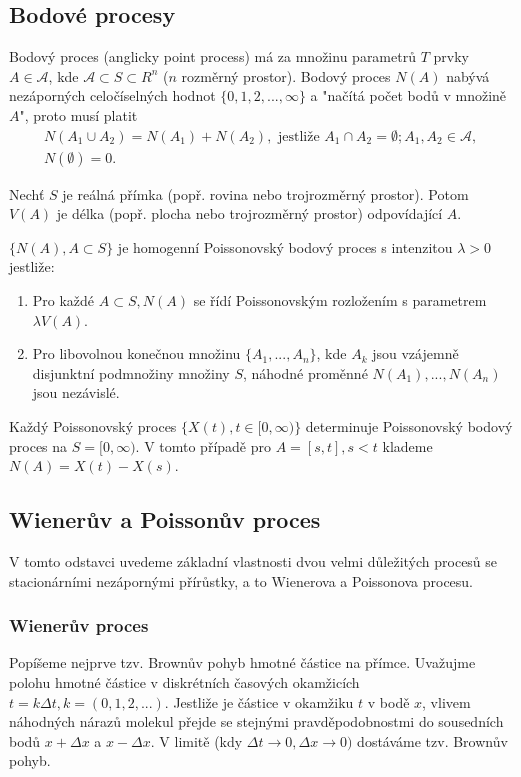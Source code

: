 \documentclass[10pt]{article}
\begin{document}
\subsection{Bodové procesy}

Bodový proces (anglicky point process) má za množinu parametrů $T$ prvky $A \in \mathcal{A}$, kde $\mathcal{A} \subset S \subset R^n$ ($n$ rozměrný prostor). Bodový proces $N(A)$ nabývá nezáporných celočíselných hodnot $\{0,1,2,...,\infty \}$ a "načítá počet bodů v množině $A$", proto musí platit
\begin{equation}
\begin{split}
N(A_1 \cup A_2) = N(A_1) + N(A_2), \text{ jestliže }A_1 \cap A_2 = \emptyset; A_1,A_2 \in \mathcal{A},\\
N(\emptyset) = 0.
\end{split}
\end{equation}

Nechť $S$ je reálná přímka (popř. rovina nebo trojrozměrný prostor). Potom $V(A)$ je délka (popř. plocha nebo trojrozměrný prostor) odpovídající $A$.

$\{N(A),A\subset S\}$ je homogenní Poissonovský bodový proces s intenzitou $\lambda > 0$ jestliže:
\begin{enumerate}
\item Pro každé $A \subset S, N(A)$ se řídí Poissonovským rozložením s parametrem $\lambda V(A)$.
\item Pro libovolnou konečnou množinu $\{A_1,...,A_n\}$, kde $A_k$ jsou vzájemně disjunktní podmnožiny množiny $S$, náhodné proměnné $N(A_1),...,N(A_n)$ jsou nezávislé.
\end{enumerate}

Každý Poissonovský proces $\{X(t),t\in  [0,\infty) \}$ determinuje Poissonovský bodový proces na $S=[0,\infty)$. V tomto případě pro $A=[s,t],s<t$ klademe $N(A) = X(t)-X(s)$.

\subsection{Wienerův a Poissonův proces}
V tomto odstavci uvedeme základní vlastnosti dvou velmi důležitých procesů se stacionárními nezápornými přírůstky, a to Wienerova a Poissonova procesu.
\subsubsection{Wienerův proces}
Popíšeme nejprve tzv. Brownův pohyb hmotné částice na přímce. Uvažujme polohu hmotné částice v diskrétních časových okamžicích $t=k\Delta t, k=(0,1,2,...).$ Jestliže je částice v okamžiku $t$ v bodě $x$, vlivem náhodných nárazů molekul přejde se stejnými pravděpodobnostmi do sousedních bodů $x+\Delta x$ a $x-\Delta x$. V limitě (kdy $\Delta t \to 0, \Delta x \to 0)$ dostáváme tzv. Brownův pohyb.
\end{document}
